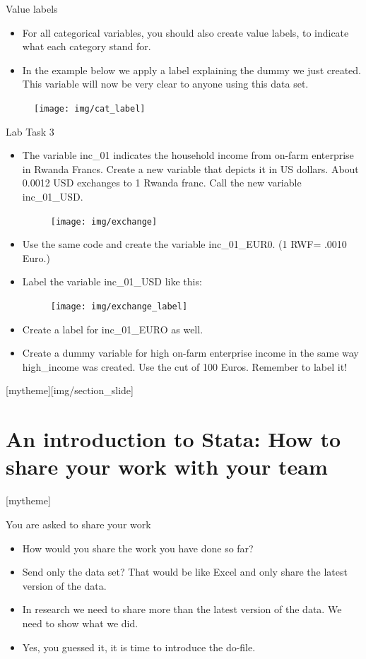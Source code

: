 \documentclass[aspectratio=169]{beamer}
\newcommand{\sectionpic}[2]{
	\setbeamertemplate{section page}[mytheme][#2]
	\section{#1}
	\setbeamertemplate{section page}[mytheme]
}
\begin{document}
\begin{frame}[fragile]{Value labels}
\begin{itemize}
	\item For all categorical variables, you should also create value labels, to indicate what each category stand for.
	\item In the example below we apply a label explaining the dummy we just created. This variable will now be very clear to anyone using this data set.
\end{itemize}
\begin{figure}
	\centering
	\texttt{[image: img/cat\_label]}
\end{figure}
\end{frame}

\begin{frame}{Lab Task 3}
\begin{itemize}
	\item The variable inc\_01 indicates the household income from on-farm enterprise in Rwanda Francs. Create a new variable that depicts it in US dollars. About 0.0012 USD exchanges to 1 Rwanda franc. Call the new variable inc\_01\_USD. 
	\begin{figure}
		\centering
		\texttt{[image: img/exchange]}
	\end{figure}
	\item Use the same code and create the variable inc\_01\_EUR0. (1 RWF= .0010 Euro.)
	\item Label the variable inc\_01\_USD like this:
	\begin{figure}
		\centering
		\texttt{[image: img/exchange\_label]}
	\end{figure}
	\item Create a label for inc\_01\_EURO as well.
	\item Create a dummy variable for high on-farm enterprise income in the same way high\_income was created. Use the cut of 100  Euros. Remember to label it!
\end{itemize}
\end{frame}

\sectionpic{An introduction to Stata: \newline How to share your work with your team}{img/section_slide}

\begin{frame}{You are asked to share your work}
\begin{itemize}
	\item How would you share the work you have done so far?
	\item Send only the data set? That would be like Excel and only share the latest version of the data.
	\item In research we need to share more than the latest version of the data. We need to show what we did.
	\item Yes, you guessed it, it is time to introduce the do-file.	
\end{itemize}
\end{frame}
\end{document}
